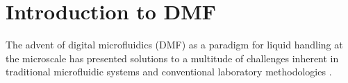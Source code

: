 \chapter{Introduction to DMF}
The advent of digital microfluidics (DMF) as a paradigm for liquid handling at the microscale has presented solutions to a multitude of challenges inherent in traditional microfluidic systems and conventional laboratory methodologies \cite{@abadianHybridPaperbasedMicrofluidics2017}.